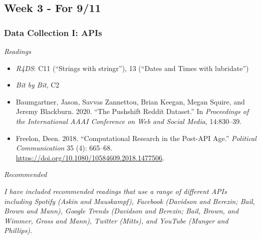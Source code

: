 \documentclass[
  10pt,
]{article}
\providecommand{\tightlist}{%
  \setlength{\itemsep}{0pt}\setlength{\parskip}{0pt}}
\begin{document}
\hypertarget{week-3---for-911}{%
\subsection{Week 3 - For 9/11}\label{week-3---for-911}}

\hypertarget{data-collection-i-apis}{%
\subsubsection{Data Collection I: APIs}\label{data-collection-i-apis}}

\emph{Readings}

\begin{itemize}
\tightlist
\item
  \emph{R4DS}: C11 (``Strings with stringr''), 13 (``Dates and Times
  with lubridate'')
\item
  \emph{Bit by Bit}, C2
\item
  Baumgartner, Jason, Savvas Zannettou, Brian Keegan, Megan Squire, and
  Jeremy Blackburn. 2020. ``The Pushshift Reddit Dataset.'' In
  \emph{Proceedings of the International AAAI Conference on Web and
  Social Media}, 14:830--39.
\item
  Freelon, Deen. 2018. ``Computational Research in the Post-API Age.''
  \emph{Political Communication} 35 (4): 665--68.
  \url{https://doi.org/10.1080/10584609.2018.1477506}.
\end{itemize}

\emph{Recommended}

\emph{I have included recommended readings that use a range of different
APIs including Spotify (Askin and Mauskampf), Facebook (Davidson and
Berezin; Bail, Brown and Mann), Google Trends (Davidson and Berezin;
Bail, Brown, and Wimmer, Gross and Mann), Twitter (Mitts), and YouTube
(Munger and Phillips).}
\end{document}
